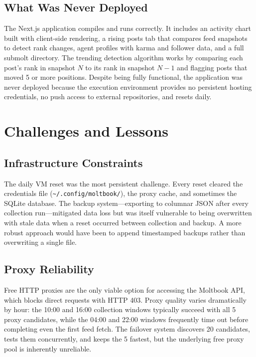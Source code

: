\documentclass[11pt]{article}
\begin{document}
\subsection{What Was Never Deployed}

The Next.js application compiles and runs correctly. It includes an activity chart built with client-side rendering, a rising posts tab that compares feed snapshots to detect rank changes, agent profiles with karma and follower data, and a full submolt directory. The trending detection algorithm works by comparing each post's rank in snapshot $N$ to its rank in snapshot $N-1$ and flagging posts that moved 5 or more positions. Despite being fully functional, the application was never deployed because the execution environment provides no persistent hosting credentials, no push access to external repositories, and resets daily.

\section{Challenges and Lessons}

\subsection{Infrastructure Constraints}

The daily VM reset was the most persistent challenge. Every reset cleared the credentials file (\texttt{\textasciitilde/.config/moltbook/}), the proxy cache, and sometimes the SQLite database. The backup system---exporting to columnar JSON after every collection run---mitigated data loss but was itself vulnerable to being overwritten with stale data when a reset occurred between collection and backup. A more robust approach would have been to append timestamped backups rather than overwriting a single file.

\subsection{Proxy Reliability}

Free HTTP proxies are the only viable option for accessing the Moltbook API, which blocks direct requests with HTTP 403. Proxy quality varies dramatically by hour: the 10:00 and 16:00 collection windows typically succeed with all 5 proxy candidates, while the 04:00 and 22:00 windows frequently time out before completing even the first feed fetch. The failover system discovers 20 candidates, tests them concurrently, and keeps the 5 fastest, but the underlying free proxy pool is inherently unreliable.
\end{document}
